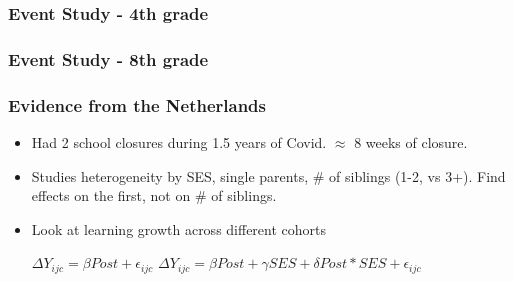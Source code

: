 \documentclass{beamer}
\begin{document}
\begin{frame}
    \label{update_scott}
    \frametitle{Event Study - 4th grade}
 {
    }
\end{frame}


\begin{frame}
    \label{update_scott}
    \frametitle{Event Study - 8th grade}
 {
    }
\end{frame}


\begin{frame}
    \label{event_cohort_m}
    \frametitle{Evidence from the Netherlands}
    \begin{itemize}
        \item Had 2 school closures during 1.5 years of Covid. $\approx$ 8 weeks of closure.
        \item Studies heterogeneity by SES, single parents, # of siblings (1-2, vs 3+). Find effects on the first, not on # of siblings.
        \item Look at learning growth across different cohorts
   
       $\Delta Y_{ijc}= \beta Post + \epsilon_{ijc}$ 
       $\Delta Y_{ijc}= \beta Post + \gamma SES + \delta Post*SES + \epsilon_{ijc}$ 
     \end{itemize}
\end{frame}
\end{document}
